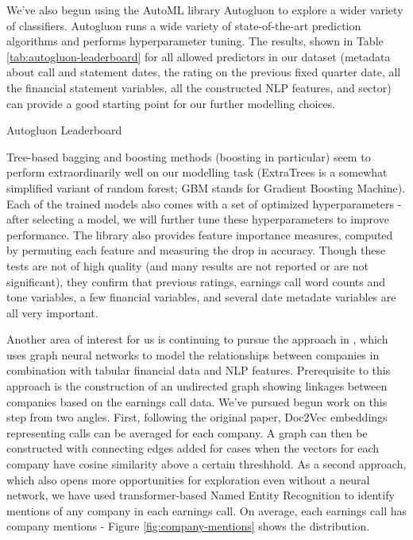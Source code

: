 \documentclass{article}[11pt]
\begin{document}
    We've also begun using the AutoML library Autogluon to explore a wider variety of classifiers. Autogluon runs a wide variety of state-of-the-art prediction algorithms and performs hyperparameter tuning. The results, shown in Table \ref{tab:autogluon-leaderboard} for all allowed predictors in our dataset (metadata about call and statement dates, the rating on the previous fixed quarter date, all the financial statement variables, all the constructed NLP features, and sector) can provide a good starting point for our further modelling choices.

    \begin{table}
        \centering
        \caption{Autogluon Leaderboard}
        
        \label{tab:autogluon-leaderboard}
    \end{table}

    Tree-based bagging and boosting methods (boosting in particular) seem to perform extraordinarily well on our modelling task (ExtraTrees is a somewhat simplified variant of random forest; GBM stands for Gradient Boosting Machine). Each of the trained models also comes with a set of optimized hyperparameters - after selecting a model, we will further tune these hyperparameters to improve performance. The library also provides feature importance measures, computed by permuting each feature and measuring the drop in accuracy. Though these tests are not of high quality (and many results are not reported or are not significant), they confirm that previous ratings, earnings call word counts and tone variables, a few financial variables, and several date metadate variables are all very important.

    Another area of interest for us is continuing to pursue the approach in \cite{das_credit_2023}, which uses graph neural networks to model the relationships between companies in combination with tabular financial data and NLP features. Prerequisite to this approach is the construction of an undirected graph showing linkages between companies based on the earnings call data. We've pursued begun work on this step from two angles. First, following the original paper, Doc2Vec embeddings representing calls can be averaged for each company. A graph can then be constructed with connecting edges added for cases when the vectors for each company have cosine similarity above a certain threshhold. As a second approach, which also opens more opportunities for exploration even without a neural network, we have used transformer-based Named Entity Recognition to identify mentions of any company in each earnings call. On average, each earnings call has \avgCompanyMentions \space company mentions - Figure \ref{fig:company-mentions} shows the distribution.
\end{document}
